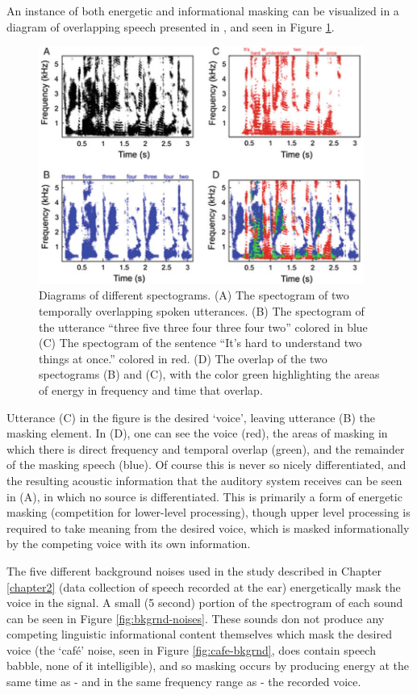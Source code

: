 An instance of both energetic and informational masking can be visualized in a diagram of overlapping speech presented in \cite{middlebrooks:17}, and seen in Figure \ref{fig:sos-masked-spctgrms}.
%
\begin{figure}[h!]
\centering
  \includegraphics[width=0.95\textwidth]{figure/speech-on-speech_masked_spectrograms.png}
  \caption{Diagrams of different spectograms. (A) The spectogram of two temporally overlapping spoken utterances. (B) The spectogram of the utterance ``three five three four three four two'' colored in blue (C) The spectogram of the sentence ``It's hard to understand two things at once.'' colored in red. (D) The overlap of the two spectograms (B) and (C), with the color green highlighting the areas of energy in frequency and time that overlap. }
  \label{fig:sos-masked-spctgrms}
\end{figure}
%
Utterance (C) in the figure is the desired `voice', leaving utterance (B) the masking element.  In (D), one can see the voice (red), the areas of masking in which there is direct frequency and temporal overlap (green), and the remainder of the masking speech (blue). Of course this is never so nicely differentiated, and the resulting acoustic information that the auditory system receives can be seen in (A), in which no source is differentiated.  This is primarily a form of energetic masking (competition for lower-level processing), though upper level processing is required to take meaning from the desired voice, which is masked informationally by the competing voice with its own information.

The five different background noises used in the study described in Chapter \ref{chapter2} (data collection of speech recorded at the ear) energetically mask the voice in the signal.  A small (5 second) portion of the spectrogram of each sound can be seen in Figure \ref{fig:bkgrnd-noises}.  These sounds don not produce any competing linguistic informational content themselves which mask the desired voice (the `caf\'{e}' noise, seen in Figure \ref{fig:cafe-bkgrnd}, does contain speech babble, none of it intelligible), and so masking occurs by producing energy at the same time as - and in the same frequency range as - the recorded voice.

